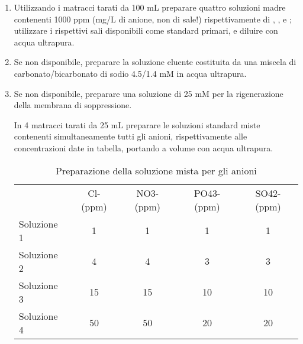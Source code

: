 \begin{enumerate}
\item Utilizzando i matracci tarati da 100 mL preparare quattro soluzioni madre contenenti 1000 ppm (mg/L di anione, non di sale!) rispettivamente di , ,  e ; utilizzare i rispettivi sali disponibili come standard primari, e diluire con acqua ultrapura.
\item Se non disponibile, preparare la soluzione eluente costituita da una miscela di carbonato/bicarbonato di sodio 4.5/1.4 mM in acqua ultrapura.
\item Se non disponibile, preparare una soluzione di  25 mM per la rigenerazione della membrana di soppressione.

In 4 matracci tarati da 25 mL preparare le soluzioni standard miste contenenti simultaneamente tutti gli anioni, rispettivamente alle concentrazioni date in tabella, portando a volume con acqua ultrapura.

\begin{table}
\begin{tabular}{lcccc}
& Cl- (ppm) & NO3- (ppm) & PO43- (ppm) & SO42- (ppm)\\
Soluzione 1 & 1 & 1 & 1 & 1\\
Soluzione 2 & 4 & 4 & 3 & 3\\
Soluzione 3 & 15 & 15 & 10 & 10\\
Soluzione 4 & 50 & 50 & 20 & 20\\
\end{tabular}
\caption{Preparazione della soluzione mista per gli anioni}
\label{tab:laboratorio:1}
\end{table}


\end{enumerate}

